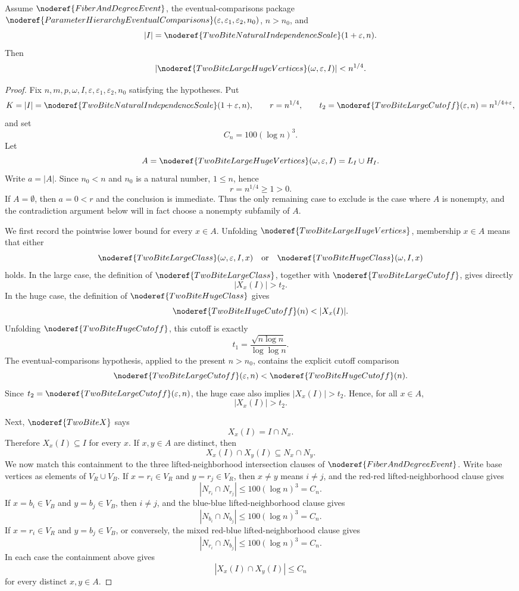 \begin{lemma}
Assume \(\noderef{FiberAndDegreeEvent}\), the eventual-comparisons package
\(\noderef{ParameterHierarchyEventualComparisons}
(\varepsilon,\varepsilon_1,\varepsilon_2,n_0)\), \(n>n_0\), and
\[
|I|=\noderef{TwoBiteNaturalIndependenceScale}(1+\varepsilon,n).
\]
Then
\[
|\noderef{TwoBiteLargeHugeVertices}(\omega,\varepsilon,I)|<n^{1/4}.
\]
\end{lemma}
\begin{proof}
Fix \(n,m,p,\omega,I,\varepsilon,\varepsilon_1,\varepsilon_2,n_0\) satisfying
the hypotheses.  Put
\[
K=|I|=\noderef{TwoBiteNaturalIndependenceScale}(1+\varepsilon,n),\qquad
r=n^{1/4},\qquad
t_2=\noderef{TwoBiteLargeCutoff}(\varepsilon,n)=n^{1/4+\varepsilon},
\]
and set
\[
C_n=100(\log n)^3.
\]
Let
\[
A=\noderef{TwoBiteLargeHugeVertices}(\omega,\varepsilon,I)=L_I\cup H_I.
\]
Write \(a=|A|\).
Since \(n_0<n\) and \(n_0\) is a natural number, \(1\le n\), hence
\[
r=n^{1/4}\ge1>0.
\]
If \(A=\emptyset\), then \(a=0<r\) and the conclusion is immediate.  Thus the
only remaining case to exclude is the case where \(A\) is nonempty, and the
contradiction argument below will in fact choose a nonempty subfamily of \(A\).

We first record the pointwise lower bound for every \(x\in A\).  Unfolding
\(\noderef{TwoBiteLargeHugeVertices}\), membership \(x\in A\) means that either
\[
\noderef{TwoBiteLargeClass}(\omega,\varepsilon,I,x)
\quad\text{or}\quad
\noderef{TwoBiteHugeClass}(\omega,I,x)
\]
holds.  In the large case, the definition of
\(\noderef{TwoBiteLargeClass}\), together with
\(\noderef{TwoBiteLargeCutoff}\), gives directly
\[
|X_x(I)|>t_2.
\]
In the huge case, the definition of \(\noderef{TwoBiteHugeClass}\) gives
\[
\noderef{TwoBiteHugeCutoff}(n)<|X_x(I)|.
\]
Unfolding \(\noderef{TwoBiteHugeCutoff}\), this cutoff is exactly
\[
t_1=\frac{\sqrt{n\log n}}{\log\log n}.
\]
The eventual-comparisons hypothesis, applied to the present \(n>n_0\), contains
the explicit cutoff comparison
\[
\noderef{TwoBiteLargeCutoff}(\varepsilon,n)
<\noderef{TwoBiteHugeCutoff}(n).
\]
Since \(t_2=\noderef{TwoBiteLargeCutoff}(\varepsilon,n)\), the huge case also
implies \(|X_x(I)|>t_2\).  Hence, for all \(x\in A\),
\[
|X_x(I)|>t_2. \tag{1}
\]

Next, \(\noderef{TwoBiteX}\) says
\[
X_x(I)=I\cap N_x.
\]
Therefore \(X_x(I)\subseteq I\) for every \(x\).  If \(x,y\in A\) are distinct,
then
\[
X_x(I)\cap X_y(I)\subseteq N_x\cap N_y.
\]
We now match this containment to the three lifted-neighborhood intersection
clauses of \(\noderef{FiberAndDegreeEvent}\).  Write base vertices as elements
of \(V_R\cup V_B\).  If \(x=r_i\in V_R\) and \(y=r_j\in V_R\), then
\(x\ne y\) means \(i\ne j\), and the red-red lifted-neighborhood clause gives
\[
|N_{r_i}\cap N_{r_j}|\le100(\log n)^3=C_n.
\]
If \(x=b_i\in V_B\) and \(y=b_j\in V_B\), then \(i\ne j\), and the blue-blue
lifted-neighborhood clause gives
\[
|N_{b_i}\cap N_{b_j}|\le100(\log n)^3=C_n.
\]
If \(x=r_i\in V_R\) and \(y=b_j\in V_B\), or conversely, the mixed red-blue
lifted-neighborhood clause gives
\[
|N_{r_i}\cap N_{b_j}|\le100(\log n)^3=C_n.
\]
In each case the containment above gives
\[
|X_x(I)\cap X_y(I)|\le C_n \tag{2}
\]
for every distinct \(x,y\in A\).


\end{proof}
